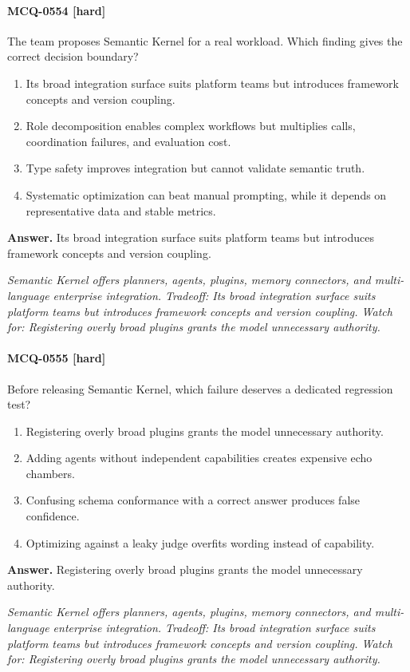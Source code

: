 \paragraph{MCQ-0554 [hard]} The team proposes Semantic Kernel for a real workload. Which finding gives the correct decision boundary?
\begin{enumerate}[label=\Alph*.]
\item Its broad integration surface suits platform teams but introduces framework concepts and version coupling.
\item Role decomposition enables complex workflows but multiplies calls, coordination failures, and evaluation cost.
\item Type safety improves integration but cannot validate semantic truth.
\item Systematic optimization can beat manual prompting, while it depends on representative data and stable metrics.
\end{enumerate}
\noindent\textbf{Answer.} Its broad integration surface suits platform teams but introduces framework concepts and version coupling.
\par\textit{Semantic Kernel offers planners, agents, plugins, memory connectors, and multi-language enterprise integration. Tradeoff: Its broad integration surface suits platform teams but introduces framework concepts and version coupling. Watch for: Registering overly broad plugins grants the model unnecessary authority.}
\paragraph{MCQ-0555 [hard]} Before releasing Semantic Kernel, which failure deserves a dedicated regression test?
\begin{enumerate}[label=\Alph*.]
\item Registering overly broad plugins grants the model unnecessary authority.
\item Adding agents without independent capabilities creates expensive echo chambers.
\item Confusing schema conformance with a correct answer produces false confidence.
\item Optimizing against a leaky judge overfits wording instead of capability.
\end{enumerate}
\noindent\textbf{Answer.} Registering overly broad plugins grants the model unnecessary authority.
\par\textit{Semantic Kernel offers planners, agents, plugins, memory connectors, and multi-language enterprise integration. Tradeoff: Its broad integration surface suits platform teams but introduces framework concepts and version coupling. Watch for: Registering overly broad plugins grants the model unnecessary authority.}
